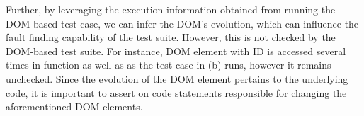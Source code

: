 Further, by leveraging the execution information obtained from running the DOM-based test case, we can infer the DOM's evolution, which can influence the fault finding capability of the test suite. However, this is not checked by the DOM-based test suite.
For instance, DOM element with ID  is accessed several times in function  as well as  as the test case in (b) runs, however it remains unchecked. Since the evolution of the  DOM element pertains to the underlying \javascript code, it is important to assert on code statements responsible for changing the aforementioned DOM elements.             

%
%
 
% 
%

